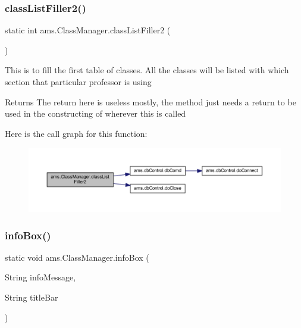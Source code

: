 \subsubsection{\texorpdfstring{classListFiller2()}{classListFiller2()}}
{\footnotesize\ttfamily static int ams.\+Class\+Manager.\+class\+List\+Filler2 (\begin{DoxyParamCaption}{ }\end{DoxyParamCaption})\hspace{0.3cm}{\ttfamily [static]}}

This is to fill the first table of classes. All the classes will be listed with which section that particular professor is using \begin{DoxyReturn}{Returns}
The return here is useless mostly, the method just needs a return to be used in the constructing of wherever this is called 
\end{DoxyReturn}
Here is the call graph for this function\+:\nopagebreak
\begin{figure}[H]
\begin{center}
\leavevmode
\includegraphics[width=350pt]{classams_1_1_class_manager_a9b0924e9fc08323cf6a91bea96f8f398_cgraph}
\end{center}
\end{figure}
\mbox{\label{classams_1_1_class_manager_a3485ea2038d2b1050bb772a27aa45b38}} 
\subsubsection{\texorpdfstring{infoBox()}{infoBox()}}
{\footnotesize\ttfamily static void ams.\+Class\+Manager.\+info\+Box (\begin{DoxyParamCaption}\item[{String}]{info\+Message,  }\item[{String}]{title\+Bar }\end{DoxyParamCaption})\hspace{0.3cm}{\ttfamily [static]}}

